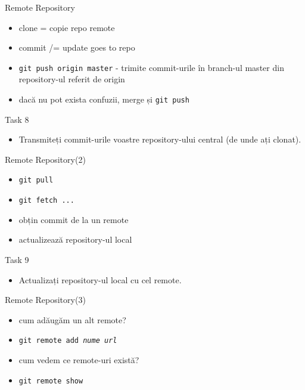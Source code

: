 \documentclass{beamer}
\begin{document}
\begin{frame}{Remote Repository}
  \begin{itemize}
    \item clone = copie repo remote
    \item commit /= update goes to repo
    \item \texttt{git push origin master} - trimite commit-urile în branch-ul
    master din repository-ul referit de origin
    \item dacă nu pot exista confuzii, merge și \texttt{git push}
  \end{itemize}
  \pause
  \begin{alertblock}{Task 8}
    \begin{itemize}
      \item Transmiteți commit-urile voastre repository-ului central (de unde
      ați clonat).
    \end{itemize}
  \end{alertblock}
\end{frame}

\begin{frame}{Remote Repository(2)}
  \begin{itemize}
    \item \texttt{git pull}
    \item \texttt{git fetch ...}
    \item obțin commit de la un remote
    \item actualizează repository-ul local
  \end{itemize}
  \pause
  \begin{alertblock}{Task 9}
    \begin{itemize}
      \item Actualizați repository-ul local cu cel remote.
    \end{itemize}
  \end{alertblock}
\end{frame}

\begin{frame}{Remote Repository(3)}
  \begin{itemize}
    \item cum adăugăm un alt remote?
    \item \texttt{git remote add \textit{nume} \textit{url}}
    \pause
    \item cum vedem ce remote-uri există?
    \item \texttt{git remote show}
  \end{itemize}
\end{frame}
\end{document}
